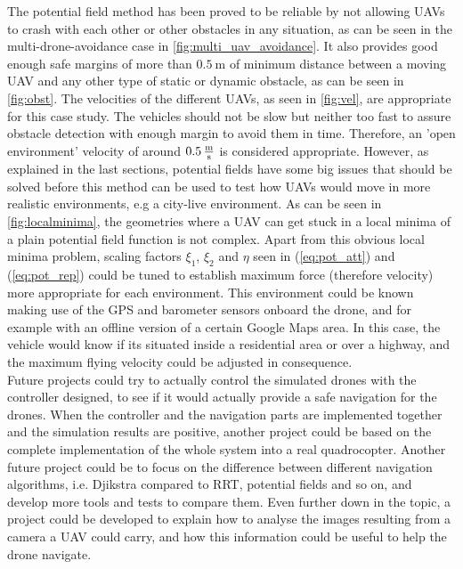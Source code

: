 \documentclass[journal]{IEEEtran}
\newcommand*{\subb}[1]{_{\mathrm{#1}}}
\begin{document}
	The potential field method has been proved to be reliable by not allowing UAVs to crash with each other or other obstacles in any situation, as can be seen in the multi-drone-avoidance case in \figurename{ \ref{fig:multi_uav_avoidance}}. It also provides good enough safe margins of more than $\SI{0.5}{\meter}$ of minimum distance between a moving UAV and any other type of static or dynamic obstacle, as can be seen in \figurename{ \ref{fig:obst}}. The velocities of the different UAVs, as seen in \figurename{ \ref{fig:vel}}, are appropriate for this case study. The vehicles should not be slow but neither too fast to assure obstacle detection with enough margin to avoid them in time. Therefore, an 'open environment' velocity of around $\SI{0.5}{\frac{\meter}{\second}}$ is considered appropriate. However, as explained in the last sections, potential fields have some big issues that should be solved before this method can be used to test how UAVs would move in more realistic environments, e.g a city-live environment. As can be seen in \figurename{ \ref{fig:localminima}}, the geometries where a UAV can get stuck in a local minima of a plain potential field function is not complex. Apart from this obvious local minima problem, scaling factors $\xi\subb{1}$, $\xi\subb{2}$ and $\eta$ seen in (\ref{eq:pot_att}) and (\ref{eq:pot_rep}) could be tuned to establish maximum force (therefore velocity) more appropriate for each environment. This environment could be known making use of the GPS and barometer sensors onboard the drone, and for example with an offline version of a certain Google Maps area. In this case, the vehicle would know if its situated inside a residential area or over a highway, and the maximum flying velocity could be adjusted in consequence.\\

	Future projects could try to actually control the simulated drones with the controller designed, to see if it would actually provide a safe navigation for the drones. When the controller and the navigation parts are implemented together and the simulation results are positive, another project could be based on the complete implementation of the whole system into a real quadrocopter. Another future project could be to focus on the difference between different navigation algorithms, i.e. Djikstra compared to RRT, potential fields and so on, and develop more tools and tests to compare them. Even further down in the topic, a project could be developed to explain how to analyse the images resulting from a camera a UAV could carry, and how this information could be useful to help the drone navigate.\\
	
\end{document}
